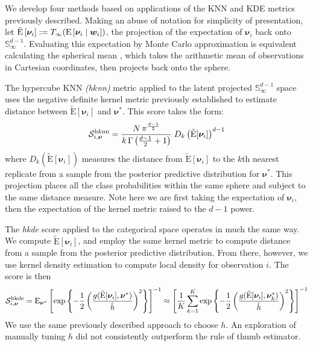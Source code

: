     We develop four methods based
    on applications of the KNN and KDE metrics previously described.
    Making an abuse of notation for simplicity of presentation, let 
    $\tilde{\text{E}}\left[\bm{\nu}_i\right] := T_{\infty}(\text{E}\left[\bm{\nu}_i\mid\bm{w}_i\right])$, 
    the projection of the expectation of $\bm{\nu}_i$ back onto 
    $\mathbb{S}_{\infty}^{d-1}$.  Evaluating this expectation by
    Monte Carlo approximation is equivalent calculating the spherical mean 
    \citep{mardia1999}, which takes the arithmetic mean of observations in 
    Cartesian coordinates, then projects back onto the sphere.

The hypercube KNN \emph{(h$k$nn)} metric applied to the latent projected 
    $\mathbb{S}_{\infty}^{d-1}$ space uses the negative definite kernel metric 
    previously established to estimate distance between $\tilde{\text{E}}[\bm{\nu}_i]$
    and $\bm{\nu}^*$.  This score takes the form:
    \begin{equation}
      \label{score:cat_hknn}
      \mathcal{S}_{i,\bm{\nu}}^{\text{h$k$nn}} = 
      \frac{N\,\pi^{\frac{d-1}{2}}}{k\,\Gamma\left(\frac{d-1}{2} + 1\right)}
        \;D_{k}\left(\tilde{\text{E}}[\bm{\nu}_i]\right)^{d-1}
    \end{equation}
    where $D_{k}\left(\tilde{\text{E}}[\bm{\nu}_i]\right)$ measures the 
    distance from $\tilde{\text{E}}[\bm{\nu}_i]$ to the $k$th nearest replicate from 
    a sample from the posterior predictive distribution for $\bm{\nu}^*$.  
    This projection places all the class probabilities within the same sphere and 
    subject to the same distance measure.  Note here we are first taking the 
    expectation of $\bm{\nu}_i$, then the expectation of the kernel metric raised 
    to the $d-1$ power.

The \emph{hkde} score applied to the categorical space operates in much the 
    same way.  We compute $\tilde{\text{E}}[\bm{\nu}_i]$, and employ the same 
    kernel metric to compute distance from a sample from the posterior predictive 
    distribution.  From there, however, we use kernel density estimation
    to compute local density for observation $i$.  The score is then
    \begin{equation}
        \label{score:cat_hkde}
        \mathcal{S}_{i,\bm{\nu}}^{\text{hkde}} = \text{E}_{\bm{\nu}^*}\left[
            \exp\left\lbrace
            -\frac{1}{2}\left(
            \frac{g(\tilde{\text{E}}[\bm{\nu}_i], \bm{\nu}^*)}{\hat{h}}
            \right)^2
            \right\rbrace
            \right]^{-1} \approx \left[\frac{1}{K}\sum_{k = 1}^{K}
                \exp\left\lbrace-\frac{1}{2}\left(
                \frac{g(\tilde{\text{E}}[\bm{\nu}_i],\bm{\nu}_k^*)}{\hat{h}}
                \right)^2\right\rbrace\right]^{-1}
    \end{equation}
We use the same previously described approach to choose $h$.  
    An exploration of manually tuning $h$ did not consistently outperform 
    the rule of thumb estimator.

